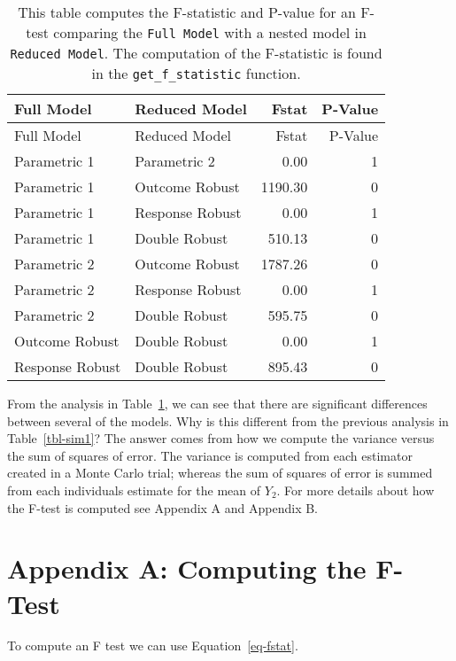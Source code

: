 \documentclass[
  letterpaper,
  DIV=11,
  numbers=noendperiod]{scrartcl}
\begin{document}
\hypertarget{tbl-fstat}{}
\begin{longtable}[]{@{}llrr@{}}
\caption{\label{tbl-fstat}This table computes the F-statistic and
P-value for an F-test comparing the \texttt{Full\ Model} with a nested
model in \texttt{Reduced\ Model}. The computation of the F-statistic is
found in the \texttt{get\_f\_statistic} function.}\tabularnewline
\toprule\noalign{}
Full Model & Reduced Model & Fstat & P-Value \\
\midrule\noalign{}
\endfirsthead
\toprule\noalign{}
Full Model & Reduced Model & Fstat & P-Value \\
\midrule\noalign{}
\endhead
\bottomrule\noalign{}
\endlastfoot
Parametric 1 & Parametric 2 & 0.00 & 1 \\
Parametric 1 & Outcome Robust & 1190.30 & 0 \\
Parametric 1 & Response Robust & 0.00 & 1 \\
Parametric 1 & Double Robust & 510.13 & 0 \\
Parametric 2 & Outcome Robust & 1787.26 & 0 \\
Parametric 2 & Response Robust & 0.00 & 1 \\
Parametric 2 & Double Robust & 595.75 & 0 \\
Outcome Robust & Double Robust & 0.00 & 1 \\
Response Robust & Double Robust & 895.43 & 0 \\
\end{longtable}

From the analysis in Table~\ref{tbl-fstat}, we can see that there are
significant differences between several of the models. Why is this
different from the previous analysis in Table~\ref{tbl-sim1}? The answer
comes from how we compute the variance versus the sum of squares of
error. The variance is computed from each estimator created in a Monte
Carlo trial; whereas the sum of squares of error is summed from each
individuals estimate for the mean of \(Y_2\). For more details about how
the F-test is computed see Appendix A and Appendix B.

\newpage{}

\hypertarget{appendix-a-computing-the-f-test}{%
\section{Appendix A: Computing the
F-Test}\label{appendix-a-computing-the-f-test}}

To compute an F test we can use Equation~\ref{eq-fstat}.
\end{document}

